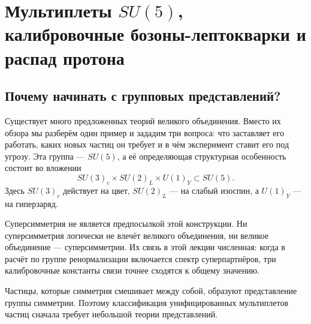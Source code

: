 \chapter{Мультиплеты \texorpdfstring{\(SU(5)\)}{SU(5)}, калибровочные бозоны-лептокварки и распад протона}


\section{Почему начинать с групповых представлений?}

Существует много предложенных теорий великого объединения. Вместо их обзора мы разберём один пример и зададим три вопроса: что заставляет его работать, каких новых частиц он требует и в чём эксперимент ставит его под угрозу. Эта группа — \(SU(5)\), а её определяющая структурная особенность состоит во вложении
\begin{equation}
SU(3)_c\times SU(2)_L\times U(1)_Y
\subset SU(5).
\label{eq:l10-sm-embedding}
\end{equation}
Здесь \(SU(3)_c\) действует на цвет, \(SU(2)_L\) — на слабый изоспин, а \(U(1)_Y\) — на гиперзаряд.

Суперсимметрия не является предпосылкой этой конструкции. Ни суперсимметрия логически не влечёт великого объединения, ни великое объединение — суперсимметрии. Их связь в этой лекции численная: когда в расчёт по группе ренормализации включается спектр суперпартнёров, три калибровочные константы связи точнее сходятся к общему значению.

Частицы, которые симметрия смешивает между собой, образуют представление группы симметрии. Поэтому классификация унифицированных мультиплетов частиц сначала требует небольшой теории представлений.

